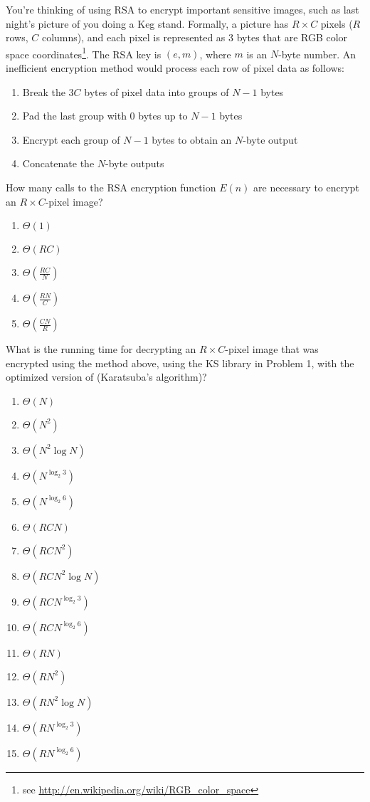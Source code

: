 \documentclass[12pt,twoside]{article}
\begin{document}
\begin{problems}
You're thinking of using RSA to encrypt important sensitive images, such as
last night's picture of you doing a Keg stand. Formally, a picture has $R \times
C$ pixels ($R$ rows, $C$ columns), and each pixel is represented as 3 bytes that
are RGB color space coordinates\footnote{see
\url{http://en.wikipedia.org/wiki/RGB_color_space}}. The RSA key is $(e, m)$,
where $m$ is an $N$-byte number. An inefficient encryption method would process
each row of pixel data as follows:
\begin{enumerate}
  \item Break the $3C$ bytes of pixel data into groups of $N-1$ bytes
  \item Pad the last group with 0 bytes up to $N-1$ bytes
  \item Encrypt each group of $N-1$ bytes to obtain an $N$-byte output
  \item Concatenate the $N$-byte outputs 
\end{enumerate}

\begin {problemparts}
\problempart {} How many calls to the RSA encryption function $E(n)$
are necessary to encrypt an $R \times C$-pixel image?
\begin{enumerate}
  \item $\Theta(1)$
  \item $\Theta(R C)$
  \item $\Theta(\frac{RC}{N})$
  \item $\Theta(\frac{RN}{C})$
  \item $\Theta(\frac{CN}{R})$
\end{enumerate}

\problempart {} What is the running time for decrypting an $R \times
C$-pixel image that was encrypted using the method above, using the KS library
in Problem 1, with the optimized version of  (Karatsuba's
algorithm)?
\begin{enumerate}
  \item $\Theta(N)$
  \item $\Theta(N^2)$
  \item $\Theta(N^2 \log N)$
  \item $\Theta(N^{\log_2 3})$
  \item $\Theta(N^{\log_2 6})$
  \item $\Theta(R C N)$
  \item $\Theta(R C N^2)$
  \item $\Theta(R C N^2 \log N)$
  \item $\Theta(R C N^{\log_2 3})$
  \item $\Theta(R C N^{\log_2 6})$
  \item $\Theta(R N)$
  \item $\Theta(R N^2)$
  \item $\Theta(R N^2 \log N)$
  \item $\Theta(R N^{\log_2 3})$
  \item $\Theta(R N^{\log_2 6})$
\end{enumerate}
\end{problemparts}
\end{problems}
\end{document}
